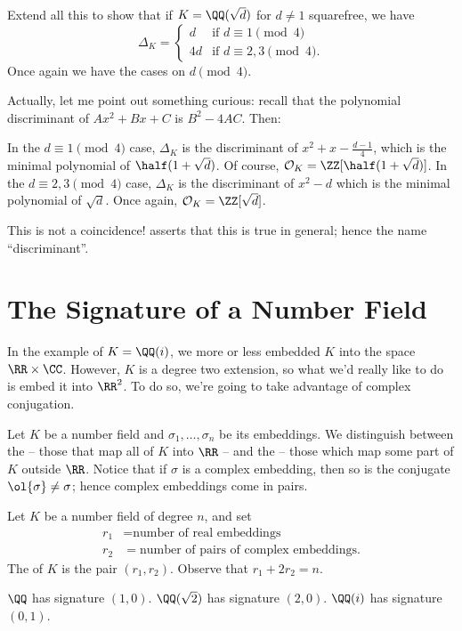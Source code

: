 \begin{exercise}
	Extend all this to show that if $K = \QQ(\sqrt d)$ for $d \neq 1$ squarefree, we have
	\[
		\Delta_K =
		\begin{cases}
			d & \text{if } d \equiv 1 \pmod 4 \\
			4d & \text{if } d \equiv 2, 3 \pmod 4.
		\end{cases}
	\]
	Once again we have the cases on $d \pmod 4$.
\end{exercise}

Actually, let me point out something curious: recall that the polynomial discriminant of $Ax^2+Bx+C$ is $B^2-4AC$. Then:
\begin{itemize}
	\ii In the $d \equiv 1 \pmod 4$ case,
	$\Delta_K$ is the discriminant of $x^2 + x - \frac{d-1}{4}$,
	which is the minimal polynomial of $\half(1+\sqrt d)$. Of course, $\OO_K = \ZZ[\half(1+\sqrt d)]$.
	\ii In the $d \equiv 2,3 \pmod 4$ case,
	$\Delta_K$ is the discriminant of $x^2 - d$
	which is the minimal polynomial of $\sqrt d$. Once again, $\OO_K = \ZZ[\sqrt d]$.
\end{itemize}
This is not a coincidence!  asserts that this is true in general;
hence the name ``discriminant''.

\section{The Signature of a Number Field}
In the example of $K = \QQ(i)$, we more or less embedded $K$ into the space $\RR \times \CC$.
However, $K$ is a degree two extension, so what we'd really like to do is embed it into $\RR^2$.
To do so, we're going to take advantage of complex conjugation.

Let $K$ be a number field and $\sigma_1, \dots, \sigma_n$ be its embeddings.
We distinguish between the  -- those that map all of $K$ into $\RR$ --
and the  -- those which map some part of $K$ outside $\RR$.
Notice that if $\sigma$ is a complex embedding, then so is the conjugate $\ol{\sigma} \ne \sigma$;
hence complex embeddings come in pairs.

\begin{definition}
	Let $K$ be a number field of degree $n$, and set
	\begin{align*}
		r_1 &= \text{number of real embeddings} \\
		r_2 &= \text{number of pairs of complex embeddings}.
	\end{align*}
	The  of $K$ is the pair $(r_1, r_2)$.
	Observe that $r_1 + 2r_2 = n$.
\end{definition}
\begin{example}
	\listhack
	\begin{enumerate}[(a)]
		\ii $\QQ$ has signature $(1,0)$.
		\ii $\QQ(\sqrt 2)$ has signature $(2,0)$.
		\ii $\QQ(i)$ has signature $(0,1)$.
	\end{enumerate}
\end{example}


